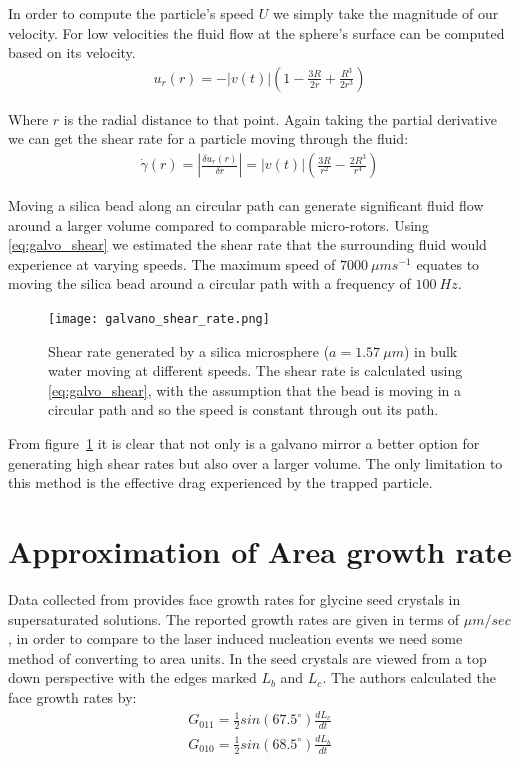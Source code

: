 \documentclass[a4paper,oneside,11pt]{book}
\begin{document}
In order to compute the particle's speed $U$ we simply take the 
magnitude of our velocity. For low velocities the fluid flow at 
the sphere's surface can be computed based on its velocity.
\begin{align}
	u_r(r)=-|v(t)|\left(1-\frac{3R}{2r}+\frac{R^3}{2r^3}\right)
\end{align}

Where $r$ is the radial distance to that point. Again taking the partial 
derivative we can get the shear rate for a particle moving through the fluid:
\begin{align}
	\dot{\gamma}(r) = \left| \frac{\delta u_r(r)}{\delta r}\right| = |v(t)|\left(\frac{3R}{r^2} -\frac{2R^3}{r^4} \right)
	\label{eq:galvo_shear}
\end{align}

Moving a silica bead along an circular path can generate significant fluid 
flow around a larger volume compared to comparable micro-rotors. Using 
\eqref{eq:galvo_shear} we estimated the shear rate that the surrounding fluid 
would experience at varying speeds. The maximum speed of $7000\ \mu m s^{-1}$
equates to moving the silica bead around a circular path with a frequency of 
$100\ Hz$.
\begin{figure}[h!]
	\centering
	\texttt{[image: galvano\_shear\_rate.png]}
	\caption{Shear rate generated by a silica microsphere ($a = 1.57\ \mu m$) 
		in bulk water moving at different speeds. The shear rate is calculated 
		using \eqref{eq:galvo_shear}, with the assumption that the bead is moving
		in a circular path and so the speed is constant through out its path.}
	\label{fig:galvano_shear}
\end{figure}

From figure~\ref{fig:galvano_shear} it is clear that not only is a galvano 
mirror a better option for generating high shear rates but also over a larger 
volume. The only limitation to this method is the effective drag experienced 
by the trapped particle. 
\newpage

\section{Approximation of Area growth rate}
Data collected from \cite{Li1992} provides face growth rates 
for glycine seed crystals in supersaturated solutions. The 
reported growth rates are given in terms of $\mu m/sec$, in 
order to compare to the laser induced nucleation events we 
need some method of converting to area units. In \cite{Li1992}
the seed crystals are viewed from a top down perspective with
the edges marked $L_b$ and $L_c$. The authors calculated the 
face growth rates by:
\begin{align}
	G_{011} = \frac{1}{2}sin(67.5^\circ)\frac{dL_c}{dt} \\
	G_{010} = \frac{1}{2}sin(68.5^\circ)\frac{dL_b}{dt}
\end{align}
\end{document}

